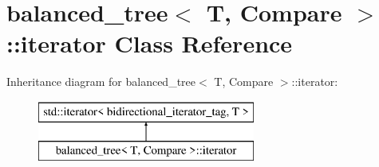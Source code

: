 \hypertarget{classbalanced__tree_1_1iterator}{\section{balanced\+\_\+tree$<$ T, Compare $>$\+:\+:iterator Class Reference}
\label{classbalanced__tree_1_1iterator}
}
Inheritance diagram for balanced\+\_\+tree$<$ T, Compare $>$\+:\+:iterator\+:\begin{figure}[H]
\begin{center}
\leavevmode
\includegraphics[height=2.000000cm]{classbalanced__tree_1_1iterator}
\end{center}
\end{figure}
